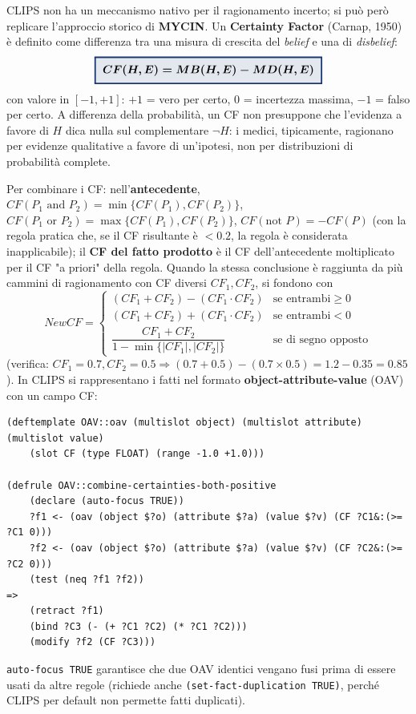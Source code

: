 \documentclass[a4paper,11pt]{article}
\newcommand{\keyeq}[1]{{\setlength{\fboxsep}{6pt}\setlength{\fboxrule}{1.3pt}\fcolorbox{iablue}{iablue!12}{\boldmath$\displaystyle #1$}}}
\begin{document}
CLIPS non ha un meccanismo nativo per il ragionamento incerto; si può però replicare l'approccio storico di \textbf{MYCIN}. Un \textbf{Certainty Factor} (Carnap, 1950) è definito come differenza tra una misura di crescita del \emph{belief} e una di \emph{disbelief}:
\[
\keyeq{CF(H,E) = MB(H,E) - MD(H,E)}
\]
con valore in $[-1,+1]$: $+1$ = vero per certo, $0$ = incertezza massima, $-1$ = falso per certo. A differenza della probabilità, un CF non presuppone che l'evidenza a favore di $H$ dica nulla sul complementare $\neg H$: i medici, tipicamente, ragionano per evidenze qualitative a favore di un'ipotesi, non per distribuzioni di probabilità complete.

Per combinare i CF: nell'\textbf{antecedente}, $CF(P_1\text{ and }P_2)=\min\{CF(P_1),CF(P_2)\}$, $CF(P_1\text{ or }P_2)=\max\{CF(P_1),CF(P_2)\}$, $CF(\text{not }P)=-CF(P)$ (con la regola pratica che, se il CF risultante è $<0.2$, la regola è considerata inapplicabile); il \textbf{CF del fatto prodotto} è il CF dell'antecedente moltiplicato per il CF "a priori" della regola. Quando la stessa conclusione è raggiunta da più cammini di ragionamento con CF diversi $CF_1,CF_2$, si fondono con
\[
NewCF = \begin{cases}
(CF_1+CF_2)-(CF_1\cdot CF_2) & \text{se entrambi} \geq 0\\
(CF_1+CF_2)+(CF_1\cdot CF_2) & \text{se entrambi} < 0\\
\dfrac{CF_1+CF_2}{1-\min\{|CF_1|,|CF_2|\}} & \text{se di segno opposto}
\end{cases}
\]
(verifica: $CF_1{=}0.7,CF_2{=}0.5\Rightarrow(0.7{+}0.5)-(0.7{\times}0.5)=1.2-0.35=0.85$). In CLIPS si rappresentano i fatti nel formato \textbf{object-attribute-value} (OAV) con un campo CF:
\begin{lstlisting}
(deftemplate OAV::oav (multislot object) (multislot attribute) (multislot value)
    (slot CF (type FLOAT) (range -1.0 +1.0)))

(defrule OAV::combine-certainties-both-positive
    (declare (auto-focus TRUE))
    ?f1 <- (oav (object $?o) (attribute $?a) (value $?v) (CF ?C1&:(>= ?C1 0)))
    ?f2 <- (oav (object $?o) (attribute $?a) (value $?v) (CF ?C2&:(>= ?C2 0)))
    (test (neq ?f1 ?f2))
=>
    (retract ?f1)
    (bind ?C3 (- (+ ?C1 ?C2) (* ?C1 ?C2)))
    (modify ?f2 (CF ?C3)))
\end{lstlisting}
\texttt{auto-focus TRUE} garantisce che due OAV identici vengano fusi prima di essere usati da altre regole (richiede anche \texttt{(set-fact-duplication TRUE)}, perché CLIPS per default non permette fatti duplicati).
\end{document}
